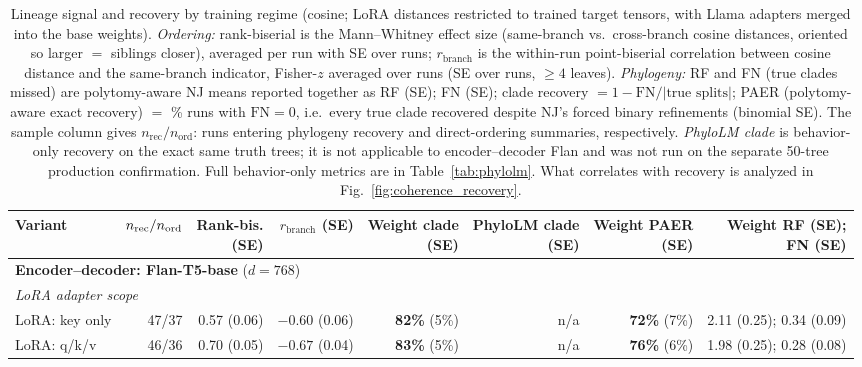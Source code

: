 \documentclass{article}
\theoremstyle{definition}
\theoremstyle{plain}
\begin{document}
\begin{table}[t]
\caption{Lineage signal and recovery by training regime (cosine; LoRA distances restricted to trained
  target tensors, with Llama adapters merged into the base weights). \emph{Ordering:} rank-biserial is the Mann--Whitney effect
  size (same-branch vs.\ cross-branch cosine distances, oriented so larger $=$ siblings closer),
  averaged per run with SE over runs; $r_{\mathrm{branch}}$ is the within-run point-biserial correlation between cosine
  distance and the same-branch indicator, Fisher-$z$ averaged over runs (SE over runs, $\geq 4$ leaves).
  \emph{Phylogeny:} RF and FN (true clades missed) are polytomy-aware NJ means reported together as
  RF (SE); FN (SE); clade recovery $=1-\mathrm{FN}/|\text{true splits}|$; PAER (polytomy-aware exact
  recovery) $=$ \% runs with $\mathrm{FN}=0$, i.e.\ every true clade recovered despite NJ's forced
  binary refinements (binomial SE). The sample column gives $n_{\mathrm{rec}}/n_{\mathrm{ord}}$:
  runs entering phylogeny recovery and direct-ordering summaries, respectively. \emph{PhyloLM clade}
  is behavior-only recovery on the exact same truth trees; it is not applicable to encoder--decoder
  Flan and was not run on the separate 50-tree production confirmation. Full behavior-only metrics are
  in Table~\ref{tab:phylolm}. What correlates with recovery is analyzed in Fig.~\ref{fig:coherence_recovery}.}
\label{tab:variants}
\begin{center}
\scriptsize
\setlength{\tabcolsep}{1.1pt}
\begin{tabular}{lrrrrrrr}
\toprule
Variant & $n_{\rm rec}/n_{\rm ord}$ & \shortstack{Rank-bis.\\(SE)} & \shortstack{$r_{\mathrm{branch}}$\\(SE)} & \shortstack{Weight clade\\(SE)} & \shortstack{PhyloLM clade\\(SE)} & \shortstack{Weight PAER\\(SE)} & \shortstack{Weight RF (SE);\\FN (SE)} \\
\midrule
\multicolumn{8}{l}{\textbf{Encoder--decoder: Flan-T5-base} ($d=768$)} \\
\multicolumn{8}{l}{\quad\textit{LoRA adapter scope}} \\
\quad LoRA: key only                    & 47/37 & 0.57 (0.06) & $-0.60$ (0.06) & \textbf{82\%} (5\%) & n/a & \textbf{72\%} (7\%) & 2.11 (0.25); 0.34 (0.09) \\
\quad LoRA: q/k/v                       & 46/36 & 0.70 (0.05) & $-0.67$ (0.04) & \textbf{83\%} (5\%) & n/a & \textbf{76\%} (6\%) & 1.98 (0.25); 0.28 (0.08) \\

\end{tabular}
\end{center}
\end{table}
\end{document}
